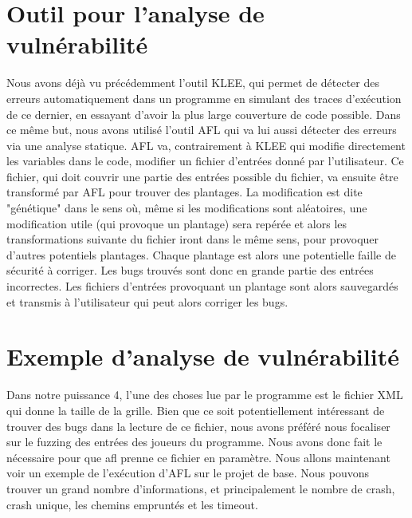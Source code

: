 \documentclass{report}
\begin{document}
\section{Outil pour l'analyse de vulnérabilité}
Nous avons déjà vu précédemment l'outil KLEE, qui permet de détecter des erreurs automatiquement dans un programme en simulant des traces d’exécution de ce dernier, en essayant d'avoir la plus large couverture de code possible. 
\newline 
Dans ce même but, nous avons utilisé l'outil AFL qui va lui aussi détecter des erreurs via une analyse statique. AFL va, contrairement à KLEE qui modifie directement les variables dans le code, modifier un fichier d'entrées donné par l'utilisateur.
\newline
Ce fichier, qui doit couvrir une partie des entrées possible du fichier, va ensuite être transformé par AFL pour trouver des plantages.
\newline
La modification est dite "génétique" dans le sens où, même si les modifications sont aléatoires, une modification utile (qui provoque un plantage) sera repérée et alors les transformations suivante du fichier iront dans le même sens, pour provoquer d'autres potentiels plantages.
\newline
Chaque plantage est alors une potentielle faille de sécurité à corriger.
Les bugs trouvés sont donc en grande partie des entrées incorrectes. 
\newline
Les fichiers d'entrées provoquant un plantage sont alors sauvegardés et transmis à l'utilisateur qui peut alors corriger les bugs.

\section{Exemple d'analyse de vulnérabilité}
Dans notre puissance 4, l'une des choses lue par le programme est le fichier XML qui donne la taille de la grille.
Bien que ce soit potentiellement intéressant de trouver des bugs dans la lecture de ce fichier, nous avons préféré nous focaliser sur le fuzzing des entrées des joueurs du programme.
Nous avons donc fait le nécessaire pour que afl prenne ce fichier en paramètre.
Nous allons maintenant voir un exemple de l'exécution d'AFL sur le projet de base.
Nous pouvons trouver un grand nombre d'informations, et principalement le nombre de crash, crash unique, les chemins empruntés et les timeout.
\end{document}

